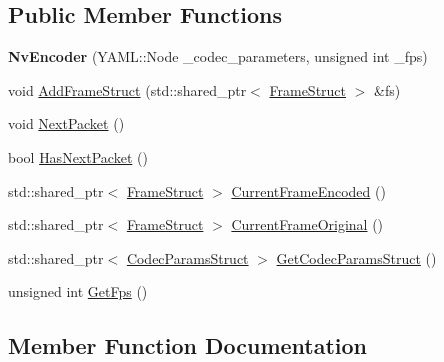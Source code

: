 \subsection*{Public Member Functions}
\begin{DoxyCompactItemize}
\item 
\mbox{\label{classmoetsi_1_1ssp_1_1NvEncoder_aab4a3ce1729dba51183b77adcc78aa5e}} 
{\bfseries Nv\+Encoder} (Y\+A\+M\+L\+::\+Node \+\_\+codec\+\_\+parameters, unsigned int \+\_\+fps)
\item 
void \hyperlink{classmoetsi_1_1ssp_1_1NvEncoder_ac3b65f82f9f4cc07ae20b7dea81fa489}{Add\+Frame\+Struct} (std\+::shared\+\_\+ptr$<$ \hyperlink{structmoetsi_1_1ssp_1_1FrameStruct}{Frame\+Struct} $>$ \&fs)
\item 
void \hyperlink{classmoetsi_1_1ssp_1_1NvEncoder_a1c6d801fbb40e7dea2b33dd2ac154919}{Next\+Packet} ()
\item 
bool \hyperlink{classmoetsi_1_1ssp_1_1NvEncoder_a4c0874d9d0d767ae7a33fe9c9a1be1de}{Has\+Next\+Packet} ()
\item 
std\+::shared\+\_\+ptr$<$ \hyperlink{structmoetsi_1_1ssp_1_1FrameStruct}{Frame\+Struct} $>$ \hyperlink{classmoetsi_1_1ssp_1_1NvEncoder_adbc7d498e797af8c5bb31b5a2a82efdd}{Current\+Frame\+Encoded} ()
\item 
std\+::shared\+\_\+ptr$<$ \hyperlink{structmoetsi_1_1ssp_1_1FrameStruct}{Frame\+Struct} $>$ \hyperlink{classmoetsi_1_1ssp_1_1NvEncoder_a56baf331eae448da89ee54b69fec170c}{Current\+Frame\+Original} ()
\item 
std\+::shared\+\_\+ptr$<$ \hyperlink{structmoetsi_1_1ssp_1_1CodecParamsStruct}{Codec\+Params\+Struct} $>$ \hyperlink{classmoetsi_1_1ssp_1_1NvEncoder_aa6229a43b12d2f27e27f518fc2229b61}{Get\+Codec\+Params\+Struct} ()
\item 
unsigned int \hyperlink{classmoetsi_1_1ssp_1_1NvEncoder_ab94b826f2aef05afad376132743001d9}{Get\+Fps} ()
\end{DoxyCompactItemize}


\subsection{Member Function Documentation}
\mbox{\label{classmoetsi_1_1ssp_1_1NvEncoder_ac3b65f82f9f4cc07ae20b7dea81fa489}} 
